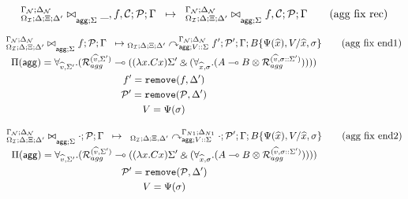 \[
\trans{
   \fixstatea{\Delta}{\Xi; \Delta'}{\_, f, \lstack{C}; \lstack{P}}{\Gamma}{\Sigma}
}
{
   \fixstatea{\Delta}{\Xi; \Delta'}{f, \lstack{C}; \lstack{P}}{\Gamma}{\Sigma}
} \tag{agg fix rec}
\]

\[
\underset{
   \begin{gathered}
   \Pi(\m{agg}) = \forall_{\widehat{v}, \Sigma'}.
   (\defstwo{agg}{\widehat{v}}{\Sigma'} \lolli ((\lambda x. C x)\Sigma' \with (\forall_{\widehat{x}, \sigma}.
                                                (A \lolli B \otimes
                                                 \defstwo{agg}{\widehat{v}}{\sigma
                                                 ::\Sigma'})))) \\
                                                 f' = \texttt{remove}(f, \Delta') \\
                                                 \lstack{P'} = \texttt{remove}(\lstack{P}, \Delta') \\
   V = \Psi(\sigma)
   \end{gathered}
}
{
   \transx{
      \fixstatea{\Delta}{\Xi; \Delta'}{f; \lstack{P}}{\Gamma}{\Sigma}
   }
   {
      \derstatea{\Delta}{\Xi; \Delta'}{\gammanew}{\deltanew}{V :: \Sigma}{f';
         \lstack{P'}}{B\{\Psi(\widehat{x}), V / \widehat{x}, \sigma \}}
   }
}
   \tag{agg fix end1}
\]

\[
\underset{
   \begin{gathered}
   \Pi(\m{agg}) = \forall_{\widehat{v}, \Sigma'}.
   (\defstwo{agg}{\widehat{v}}{\Sigma'} \lolli ((\lambda x. C x)\Sigma' \with (\forall_{\widehat{x}, \sigma}.
                                                (A \lolli B \otimes
                                                 \defstwo{agg}{\widehat{v}}{\sigma
                                                 ::\Sigma'})))) \\
                                                 \lstack{P'} = \texttt{remove}(\lstack{P}, \Delta') \\
   V = \Psi(\sigma)
   \end{gathered}
}
{
   \trans{
      \fixstatea{\Delta}{\Xi; \Delta'}{\cdot; \lstack{P}}{\Gamma}{\Sigma}
   }
   {
      \derstatea{\Delta}{\Xi, \Delta'}{\Gamma_{N1}}{\Delta_{N1}}{V :: \Sigma}{\cdot;
         \lstack{P}'}{B\{\Psi(\widehat{x}), V / \widehat{x}, \sigma \}}
   }
} \tag{agg fix end2}
\]
